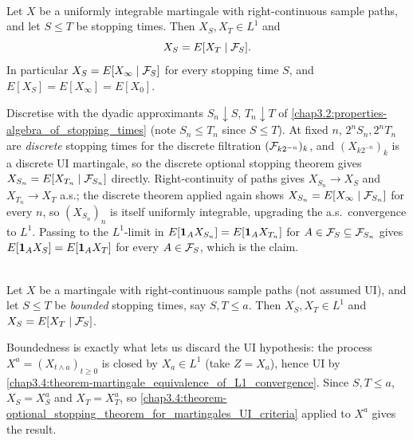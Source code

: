 \begin{theorem} \label{chap3.4:theorem-optional_stopping_theorem_for_martingales_UI_criteria}  \\
Let $X$ be a uniformly integrable martingale with right-continuous sample paths, and let $S\le T$ be stopping times. Then $X_S,X_T\in L^1$ and
$$X_S=E[X_T\mid\mathcal{F}_S].$$
In particular $X_S=E[X_\infty\mid\mathcal{F}_S]$ for every stopping time $S$, and $E[X_S]=E[X_\infty]=E[X_0]$.
\end{theorem}
\begin{proofidea}
Discretise with the dyadic approximants $S_n\downarrow S$, $T_n\downarrow T$ of \cref{chap3.2:properties-algebra_of_stopping_times} (note $S_n\le T_n$ since $S\le T$). At fixed $n$, $2^nS_n,2^nT_n$ are \emph{discrete} stopping times for the discrete filtration $(\mathcal{F}_{k2^{-n}})_k$, and $(X_{k2^{-n}})_k$ is a discrete UI martingale, so the discrete optional stopping theorem gives $X_{S_n}=E[X_{T_n}\mid\mathcal{F}_{S_n}]$ directly. Right-continuity of paths gives $X_{S_n}\to X_S$ and $X_{T_n}\to X_T$ a.s.; the discrete theorem applied again shows $X_{S_n}=E[X_\infty\mid\mathcal{F}_{S_n}]$ for every $n$, so $(X_{S_n})_n$ is itself uniformly integrable, upgrading the a.s.\ convergence to $L^1$. Passing to the $L^1$-limit in $E[\mathbf{1}_AX_{S_n}]=E[\mathbf{1}_AX_{T_n}]$ for $A\in\mathcal{F}_S\subseteq\mathcal{F}_{S_n}$ gives $E[\mathbf{1}_AX_S]=E[\mathbf{1}_AX_T]$ for every $A\in\mathcal{F}_S$, which is the claim.
\end{proofidea}

\begin{theorem} \label{chap3.4:theorem-optional_stopping_theorem_for_martingales_bounded_stopping_times}  \\
Let $X$ be a martingale with right-continuous sample paths (not assumed UI), and let $S\le T$ be \emph{bounded} stopping times, say $S,T\le a$. Then $X_S,X_T\in L^1$ and $X_S=E[X_T\mid\mathcal{F}_S]$.
\end{theorem}
\begin{proofidea}
Boundedness is exactly what lets us discard the UI hypothesis: the process $X^a=(X_{t\wedge a})_{t\ge0}$ is closed by $X_a\in L^1$ (take $Z=X_a$), hence UI by \cref{chap3.4:theorem-martingale_equivalence_of_L1_convergence}. Since $S,T\le a$, $X_S=X^a_S$ and $X_T=X^a_T$, so \cref{chap3.4:theorem-optional_stopping_theorem_for_martingales_UI_criteria} applied to $X^a$ gives the result.
\end{proofidea}


